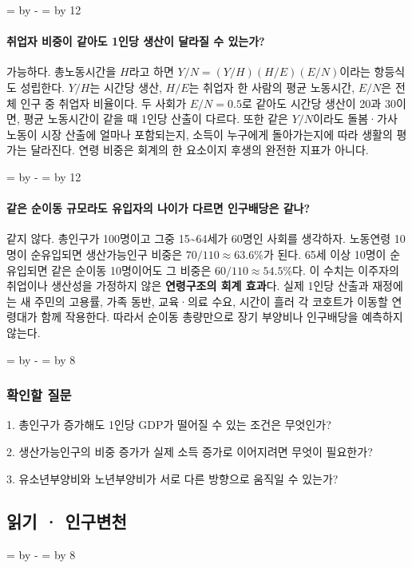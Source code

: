 \documentclass[10pt,a4paper]{article}
\newcommand{\ReserveQuestionSpace}{%
  \par\begingroup
  \dimen0=\pagegoal \advance\dimen0 by -\pagetotal
  \dimen2=\baselineskip \multiply\dimen2 by 12
  \ifdim\dimen0<\dimen2 \newpage\fi
  \endgroup}
\newcommand{\ReserveReadingSectionSpace}{%
  \par\begingroup
  \dimen0=\pagegoal \advance\dimen0 by -\pagetotal
  \dimen2=\baselineskip \multiply\dimen2 by 8
  \ifdim\dimen0<\dimen2 \newpage\fi
  \endgroup}
\begin{document}
\ReserveQuestionSpace
\paragraph{취업자 비중이 같아도 1인당 생산이 달라질 수 있는가?}
가능하다. 총노동시간을 $H$라고 하면 $Y/N=(Y/H)(H/E)(E/N)$이라는 항등식도 성립한다. $Y/H$는 시간당 생산, $H/E$는 취업자 한 사람의 평균 노동시간, $E/N$은 전체 인구 중 취업자 비율이다. 두 사회가 $E/N=0.5$로 같아도 시간당 생산이 20과 30이면, 평균 노동시간이 같을 때 1인당 산출이 다르다. 또한 같은 $Y/N$이라도 돌봄·가사 노동이 시장 산출에 얼마나 포함되는지, 소득이 누구에게 돌아가는지에 따라 생활의 평가는 달라진다. 연령 비중은 회계의 한 요소이지 후생의 완전한 지표가 아니다.\par

\ReserveQuestionSpace
\paragraph{같은 순이동 규모라도 유입자의 나이가 다르면 인구배당은 같나?}
같지 않다. 총인구가 100명이고 그중 15\textasciitilde{}64세가 60명인 사회를 생각하자. 노동연령 10명이 순유입되면 생산가능인구 비중은 $70/110\approx63.6\%$가 된다. 65세 이상 10명이 순유입되면 같은 순이동 10명이어도 그 비중은 $60/110\approx54.5\%$다. 이 수치는 이주자의 취업이나 생산성을 가정하지 않은 \textbf{연령구조의 회계 효과}다. 실제 1인당 산출과 재정에는 새 주민의 고용률, 가족 동반, 교육·의료 수요, 시간이 흘러 각 코호트가 이동할 연령대가 함께 작용한다. 따라서 순이동 총량만으로 장기 부양비나 인구배당을 예측하지 않는다.\par

\ReserveReadingSectionSpace
\subsubsection*{확인할 질문}

1. 총인구가 증가해도 1인당 GDP가 떨어질 수 있는 조건은 무엇인가?\par
2. 생산가능인구의 비중 증가가 실제 소득 증가로 이어지려면 무엇이 필요한가?\par
3. 유소년부양비와 노년부양비가 서로 다른 방향으로 움직일 수 있는가?\par


\clearpage{}
{}
\subsection*{읽기 · 인구변천}
\ReserveReadingSectionSpace
\end{document}
